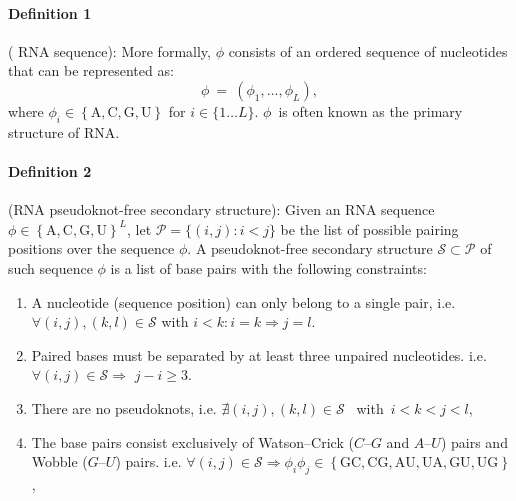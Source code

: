 \paragraph{\textbf{Definition 1}} ( RNA sequence): More formally, $\phi$ consists of an ordered sequence of nucleotides that can be represented as:~ \begin{equation}
\phi\ =\ \left(\phi_1,...,\phi_L\right),
\end{equation}
where $\phi_i\in\left\{\text{A},\text{C},\text{G},\text{U}\right\}$ for $i\in \{1\dots L\}$.
\(\phi\)~is often known as the primary structure of RNA.

\paragraph{\textbf{Definition 2} } (RNA pseudoknot-free secondary structure): Given an RNA sequence $\phi \in \left\{\text{A},\text{C},\text{G},\text{U}\right\}^L$, let $\mathcal{P}=\big \{(i,j) \colon i<j \big \}$ be the list of possible pairing positions over the sequence $\phi$. A pseudoknot-free secondary structure $ \mathcal{S}\subset \mathcal{P} $ of such sequence $\phi$ is a list of base pairs  with the following constraints:
\begin{enumerate}
	\item A nucleotide (sequence position) can only belong to a single pair, i.e. $\forall (i,j), (k,l) \in \mathcal{S}$ with $i<k \colon i=k \Rightarrow j=l$.
	\item Paired bases must be separated by at least three
	unpaired nucleotides. i.e. \(\forall (i,j) \in \mathcal{S} \Rightarrow \) \(j-i\geq3\).
	\item There are no pseudoknots, i.e. $ \nexists \left(i,j\right), \left(k,l\right) \in \mathcal{S}$
	~with~\(i<k<j<l\),
	\item The base pairs consist exclusively of Watson–Crick ($C–G$ and $A–U$) pairs and Wobble ($G–U$) pairs. i.e. $\forall \left(i,j\right) \in \mathcal{S}\Rightarrow \phi_i\phi_j \in \left\{\text{GC},\text{CG},\text{AU},\text{UA},\text{GU},\text{UG}\right\}$,
\end{enumerate}

